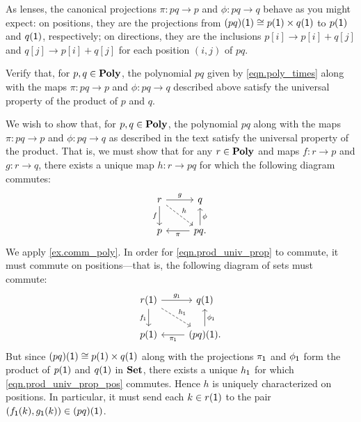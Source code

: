 \documentclass[Book-Poly]{subfiles}
\begin{document}
As lenses, the canonical projections $\pi \colon pq \to p$ and $\phi \colon pq \to q$ behave as you might expect: on positions, they are the projections from $(pq)(\textsf{1}) \cong p(\textsf{1}) \times q(\textsf{1})$ to $p(\textsf{1})$ and $q(\textsf{1})$, respectively; on directions, they are the inclusions $p[i] \to p[i] + q[j]$ and $q[j] \to p[i] + q[j]$ for each position $(i, j)$ of $pq$.

\begin{exercise} \label{exc.poly_prod}
Verify that, for $p, q \in \mathbf{Poly}$, the polynomial $pq$ given by \eqref{eqn.poly_times} along with the maps $\pi \colon pq \to p$ and $\phi \colon pq \to q$ described above satisfy the universal property of the product of $p$ and $q$.
\begin{solution}
We wish to show that, for $p, q \in \mathbf{Poly}$, the polynomial $pq$ along with the maps $\pi \colon pq \to p$ and $\phi \colon pq \to q$ as described in the text satisfy the universal property of the product.
That is, we must show that for any $r \in \mathbf{Poly}$ and maps $f \colon r \to p$ and $g \colon r \to q$, there exists a unique map $h \colon r \to pq$ for which the following diagram commutes:
\begin{equation} \label{eqn.prod_univ_prop}
\begin{tikzcd}
	r \ar[d, "f"'] \ar[r, "g"] \ar[dr, "h", dashed] & q \\
	p & pq. \ar[l, "\pi"] \ar[u, "\phi"'] 
\end{tikzcd}
\end{equation}
We apply \cref{ex.comm_poly}.
In order for \eqref{eqn.prod_univ_prop} to commute, it must commute on positions---that is, the following diagram of sets must commute:
\begin{equation} \label{eqn.prod_univ_prop_pos}
\begin{tikzcd}
	r(\1) \ar[d, "f_\1"'] \ar[r, "g_\1"] \ar[dr, "h_\1", dashed] & q(\1) \\
	p(\1) & (pq)(\1). \ar[l, "\pi_\1"] \ar[u, "\phi_\1"'] 
\end{tikzcd}
\end{equation}
But since $(pq)(\textsf{1}) \cong p(1) \times q(\textsf{1})$ along with the projections $\pi_{\textsf{1}}$ and $\phi_{\textsf{1}}$ form the product of $p(\textsf{1})$ and $q(\textsf{1})$ in $\mathbf{Set}$, there exists a unique $h_{\textsf{1}}$ for which \eqref{eqn.prod_univ_prop_pos} commutes.
Hence $h$ is uniquely characterized on positions.
In particular, it must send each $k \in r(\textsf{1})$ to the pair $(f_{\textsf{1}}(k), g_{\textsf{1}}(k)) \in (pq)(\textsf{1})$.


\end{solution}
\end{exercise}
\end{document}
